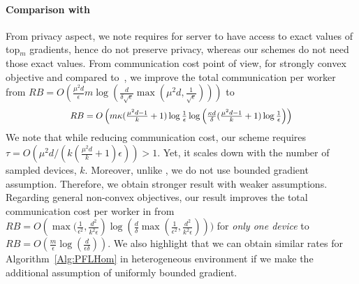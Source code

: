 \documentclass[twoside]{article}
\newcommand*{\Resize}[2]{\resizebox{#1}{!}{$#2$}}%
\begin{document}
\paragraph{Comparison with \cite{ivkin2019communication}}
From privacy aspect, we note \cite{ivkin2019communication} requires for server to have access to exact values of top$_m$ gradients, hence do not preserve privacy, whereas our schemes do not need those exact values. From communication cost point of view, for strongly convex objective and compared to~\cite{ivkin2019communication}, we improve the total communication per worker from 
$RB=O\left(\frac{\mu^2 d}{\epsilon}m\log\left(\frac{d}{\delta\sqrt{\epsilon}}\max\left({\mu^2 d},\frac{1}{\sqrt{\epsilon}}\right)\right)\right)$ to 
\[ \Resize{8cm}{RB=O\left({m}\kappa(\frac{\mu^2d-1}{k}+1)\log\frac{1}{\epsilon}\log\left(\frac{\kappa d}{\delta}(\frac{\mu^2d-1}{k}+1)\log\frac{1}{\epsilon}\right)\right)}\]
We note that while reducing communication cost, our scheme requires $\tau=O(\mu^2 d/(k(\frac{\mu^2 d}{k}+1)\epsilon))>1$. 
Yet, it scales down with the number of sampled devices, $k$. 
Moreover, unlike \cite{ivkin2019communication}, we do not use bounded gradient assumption. 
Therefore, we obtain stronger result with weaker assumptions. 
Regarding general non-convex objectives, our result improves the total communication cost per worker in \cite{ivkin2019communication} from $RB=O\left(\max(\frac{1}{\epsilon^2},\frac{d^2}{k^2\epsilon}\right)\log(\frac{d}{\delta}\max(\frac{1}{\epsilon^2},\frac{d^2}{k^2\epsilon})))$ for \emph{only one device} to $RB=O(\frac{m}{\epsilon}\log(\frac{d}{\epsilon\delta}))$. 
We also highlight that we can obtain similar rates for Algorithm~\ref{Alg:PFLHom} in heterogeneous environment if we make the additional assumption of uniformly bounded gradient.
\end{document}
